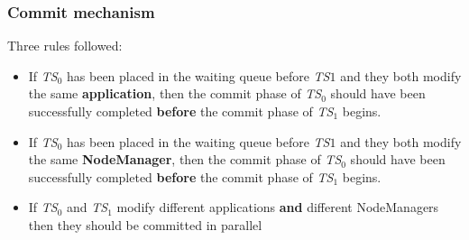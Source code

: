 \documentclass{beamer}
\begin{document}
\begin{frame}
\frametitle{Commit mechanism}
Three rules followed:

\begin{itemize}
\item<1,4> If \emph{TS$_0$} has been placed in the waiting queue before
  \emph{TS$1$} and they both modify the same \textbf{application},
  then the commit phase of \emph{TS$_0$} should have been successfully
  completed \textbf{before} the commit phase of \emph{TS$_1$} begins.

\item<2,4> If \emph{TS$_0$} has been placed in the waiting queue before
  \emph{TS$1$} and they both modify the same \textbf{NodeManager},
  then the commit phase of \emph{TS$_0$} should have been successfully
  completed \textbf{before} the commit phase of \emph{TS$_1$} begins.

\item<3,4> If \emph{TS$_0$} and \emph{TS$_1$} modify different
  applications \textbf{and} different NodeManagers then they should be
  committed in parallel
\end{itemize}
\end{frame}
\end{document}
